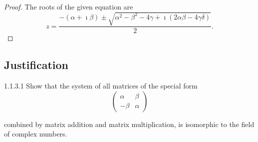 \begin{proof}
	The roots of the given equation are
	\[
		z = \dfrac{-(\alpha + \imath\beta) \pm \sqrt{\alpha^{2} - \beta^{2} - 4\gamma + \imath(2\alpha\beta - 4\gamma\delta)}}{2}.
	\]
\end{proof}

\subsection{Justification}

\begin{problem}{1.1.3.1}
Show that the system of all matrices of the special form
\[
	\begin{pmatrix}
		\alpha & \beta  \\
		-\beta & \alpha
	\end{pmatrix}
\]

combined by matrix addition and matrix multiplication, is isomorphic to the field of complex numbers.
\end{problem}

